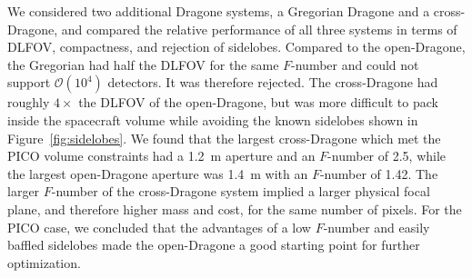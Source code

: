 \documentclass[]{spie}  %
\newcommand{\comr}[1]{\textcolor{red}{#1}}
\newcommand{\como}[1]{\textcolor{orange}{#1}}
\begin{document}
We considered two additional Dragone systems, a Gregorian Dragone and a cross-Dragone, and compared the 
relative performance of all three systems in terms of DLFOV, compactness, and rejection of sidelobes.  
Compared to the open-Dragone, the Gregorian had half the DLFOV for the same $F$-number and could not  
support $\mathcal{O}(10^4)$ detectors. It was therefore rejected.  
The cross-Dragone had roughly $4\times$ the DLFOV of the open-Dragone, 
but was more difficult to pack inside the spacecraft volume while avoiding the known sidelobes shown in Figure~\ref{fig:sidelobes}.
We found that the largest cross-Dragone which met the PICO volume constraints had 
a 1.2~m aperture and an $F$-number of 2.5, while the largest open-Dragone aperture was 1.4~m with an $F$-number of 1.42. The larger 
$F$-number of the cross-Dragone system implied a larger physical focal plane, and therefore higher mass and cost, 
for the same number of pixels. 
For the PICO case, we concluded that the advantages of a low $F$-number and easily baffled sidelobes made the open-Dragone a good starting  
point for further optimization. 

\end{document}

